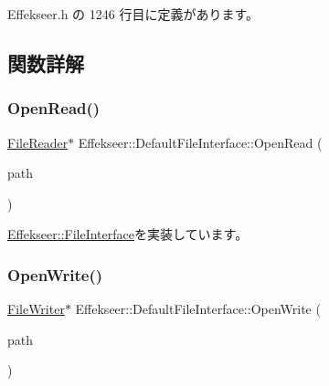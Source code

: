  Effekseer.\+h の 1246 行目に定義があります。



\subsection{関数詳解}
\mbox{\label{class_effekseer_1_1_default_file_interface_a03d6224d1eb0124a21f42c578e447d51}} 
\subsubsection{\texorpdfstring{Open\+Read()}{OpenRead()}}
{\footnotesize\ttfamily \mbox{\hyperlink{class_effekseer_1_1_file_reader}{File\+Reader}}$\ast$ Effekseer\+::\+Default\+File\+Interface\+::\+Open\+Read (\begin{DoxyParamCaption}\item[{const \mbox{\hyperlink{_effekseer_8h_a50b026abea014b47854bcd835b3b6233}{E\+F\+K\+\_\+\+C\+H\+AR}} $\ast$}]{path }\end{DoxyParamCaption})\hspace{0.3cm}{\ttfamily [virtual]}}



\mbox{\hyperlink{class_effekseer_1_1_file_interface_ad8744ad57226d9a2ce74f6ef6e2f9a41}{Effekseer\+::\+File\+Interface}}を実装しています。

\mbox{\label{class_effekseer_1_1_default_file_interface_aecbcd4350ca701360dcea88a2c5f9c64}} 
\subsubsection{\texorpdfstring{Open\+Write()}{OpenWrite()}}
{\footnotesize\ttfamily \mbox{\hyperlink{class_effekseer_1_1_file_writer}{File\+Writer}}$\ast$ Effekseer\+::\+Default\+File\+Interface\+::\+Open\+Write (\begin{DoxyParamCaption}\item[{const \mbox{\hyperlink{_effekseer_8h_a50b026abea014b47854bcd835b3b6233}{E\+F\+K\+\_\+\+C\+H\+AR}} $\ast$}]{path }\end{DoxyParamCaption})\hspace{0.3cm}{\ttfamily [virtual]}}




